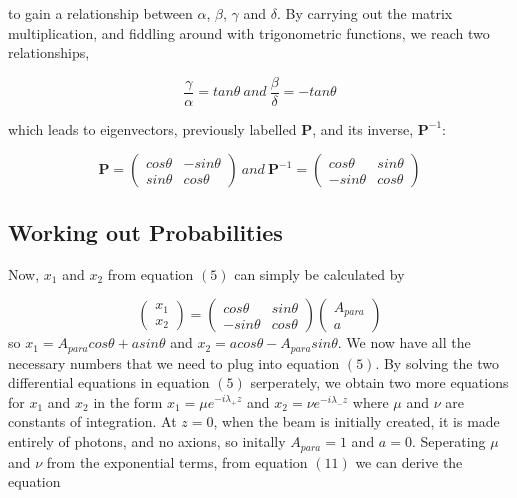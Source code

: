 \documentclass[12pt]{article}
\begin{document}
to gain a relationship between $\alpha$, $\beta$, $\gamma$ and $\delta$.
By carrying out the matrix multiplication, and fiddling around with trigonometric functions, we reach two relationships, 

\begin{equation*}
\frac{\gamma}{\alpha} = tan\theta \ and \ \frac{\beta}{\delta} = -tan\theta
\end{equation*}

which leads to eigenvectors, previously labelled $\textbf{P}$, and its inverse, $\textbf{P}^{-1}$:

\begin{equation*}
\textbf{P} = \left( \begin{array}{ccc}
cos\theta & -sin\theta \\
sin\theta & cos\theta \end{array} \right) \ and \ 
\textbf{P}^{-1} = \left( \begin{array}{ccc}
cos\theta & sin\theta \\
-sin\theta & cos\theta \end{array} \right)
\end{equation*}

\subsection{Working out Probabilities}
Now, $x_1$ and $x_2$ from equation $(5)$ can simply be calculated by 

\begin{equation}
\left( \begin{array}{ccc} x_1 \\ x_2 \end{array} \right) = \left( \begin{array}{ccc} cos\theta & sin\theta \\
-sin\theta & cos\theta \end{array} \right) 
\left( \begin{array}{ccc} A_{para} \\ a \end{array} \right)
\end{equation}
so $x_1 = A_{para}cos\theta + asin\theta$ and $x_2 = acos\theta - A_{para}sin\theta$. We now have all the necessary numbers that we need to plug into equation $(5)$. By solving the two differential equations in equation $(5)$ serperately, we obtain two more equations for $x_1$ and $x_2$ in the form $ x_1 = \mu e^{-i\lambda_+z}$ and $x_2 = \nu e^{-i\lambda_-z}$ where $\mu$ and $\nu$ are constants of integration. At $z=0$, when the beam is initially created, it is made entirely of photons, and no axions, so initally $A_{para}=1$ and $a=0$. Seperating $\mu$ and $\nu$ from the exponential terms, from equation $(11)$ we can derive the equation
\end{document}
